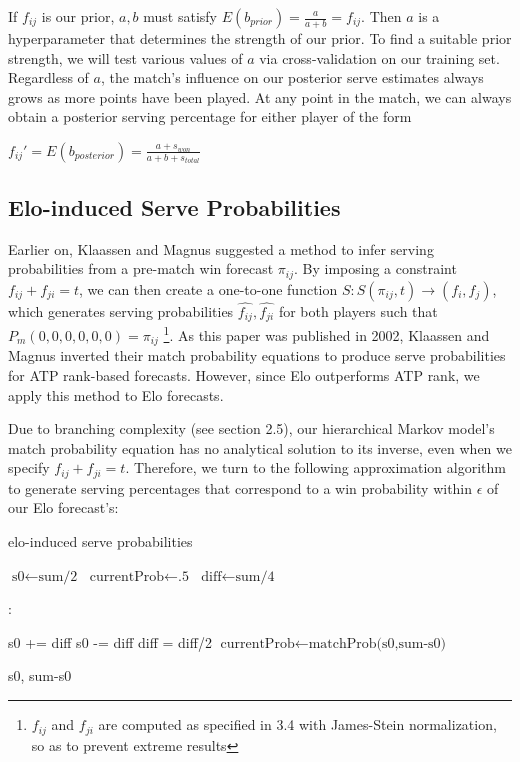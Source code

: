 \documentclass[chapterprefix=false]{report}
\begin{document}
If $f_{ij}$ is our prior, $a,b$ must satisfy $E(b_{prior}) = \frac{a}{a+b} = f_{ij}$. Then $a$ is a hyperparameter that determines the strength of our prior. To find a suitable prior strength, we will test various values of $a$ via cross-validation on our training set. Regardless of $a$, the match's influence on our posterior serve estimates always grows as more points have been played. At any point in the match, we can always obtain a posterior serving percentage for either player of the form

$f_{ij}' = E(b_{posterior}) = \frac{a + s_{won}}{a + b + s_{total}}$



\subsection{Elo-induced Serve Probabilities}
Earlier on, Klaassen and Magnus suggested a method to infer serving probabilities from a pre-match win forecast $\pi_{ij}$. By imposing a constraint $f_{ij}+f_{ji}=t$, we can then create a one-to-one function 
$S: S(\pi_{ij},t) \rightarrow (f_i,f_j)$, which generates serving probabilities $\hat{f_{ij}},\hat{f_{ji}}$ for both players such that $P_{m}(0,0,0,0,0,0)=\pi_{ij}$ \footnote{$f_{ij}$ and $f_{ji}$ are computed as specified in 3.4 with James-Stein normalization, so as to prevent extreme results}. As this paper was published in 2002, Klaassen and Magnus inverted their match probability equations to produce serve probabilities for ATP rank-based forecasts. However, since Elo outperforms ATP rank, we apply this method to Elo forecasts.

Due to branching complexity (see section 2.5), our hierarchical Markov model's match probability equation has no analytical solution to its inverse, even when we specify $f_{ij}+f_{ji}=t$. Therefore, we turn to the following approximation algorithm to generate serving percentages that correspond to a win probability within $\epsilon$ of our Elo forecast's:

\begin{algorithm}[H]
\caption{elo-induced serve probabilities}\label{euclid}
\begin{algorithmic}[H]
\State $\text{s0} \gets \text{sum/2}$
\State $\text{currentProb} \gets \text{.5}$
\State $\text{diff} \gets \text{sum/4}$

:

\State s0 += diff 
\Else
\State s0 -= diff
\EndIf
\State diff = diff/2
\State $\text{currentProb} \gets \text{matchProb(s0,sum-s0)}$

\EndWhile


\State \Return s0, sum-s0

\EndProcedure
\end{algorithmic}
\end{algorithm}
\end{document}
